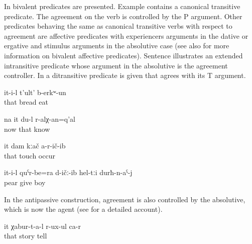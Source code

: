 In  bivalent predicates are presented. Example  contains a canonical transitive predicate. The agreement on the verb is controlled by the P argument. Other predicates behaving the same as canonical transitive verbs with respect to agreement are affective predicates with experiencers arguments in the dative or ergative and stimulus arguments in the absolutive case  (see also  for more information on bivalent affective predicates). Sentence  illustrates an extended intransitive predicate whose argument in the absolutive is the agreement controller. In  a ditransitive predicate is given that agrees with its T argument.
%
\begin{exe}
		\ex	\label{ex:S/he ate bread@13a}
		\gll	it-i-l	t'ult'	b-erkʷ-un\\
			that	bread	eat\\
		\glt	{}

		\ex	\label{ex:Well, I must know her}
		\gll	na	it	du-l	r-alχ-an=q'al\\	
			now	that		know\\
		\glt	{}

		\ex	\label{ex:She did not touch me@8a}
		\gll	it	dam	kːač a-r-ič-ib\\	
			that		touch occur\\
		\glt	{}

		\ex	\label{ex:He gave pears to the boys@8b}
		\gll	it-i-l	quˁr-be=ra	d-ičː-ib	hel-tːi	durħ-n-aˁ-j\\
				pear	give		boy\\
		\glt	{}
\end{exe}

In the antipassive construction, agreement is also controlled by the absolutive, which is now the agent  (see  for a detailed account).
%
\begin{exe}
	\ex	\label{ex:‎‎She is telling stories}
	\gll	it	χabur-t-a-l	r-ux-ul	ca-r\\
		that	story	tell	\\
	\glt	{}
\end{exe}

